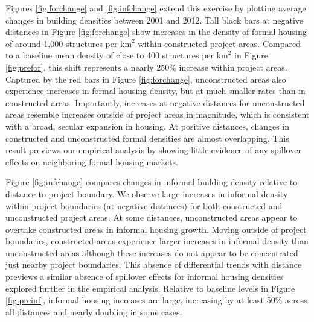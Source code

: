 \documentclass[12pt]{article}
\begin{document}
Figures \ref{fig:forchange} and \ref{fig:infchange} extend this exercise by plotting average changes in building densities between 2001 and 2012.  Tall black bars at negative distances in Figure \ref{fig:forchange} show increases in the density of formal housing of around 1,000 structures per $\text{km}^{2}$ within constructed project areas.  Compared to a baseline mean density of close to 400 structures per $\text{km}^{2}$ in Figure \ref{fig:prefor}, this shift represents a nearly 250\% increase within project areas.  Captured by the red bars in Figure \ref{fig:forchange}, unconstructed areas also experience increases in formal housing density, but at much smaller rates than in constructed areas.  Importantly, increases at negative distances for unconstructed areas resemble increases outside of project areas in magnitude, which is consistent with a broad, secular expansion in housing.  At positive distances, changes in constructed and unconstructed formal densities are almost overlapping.  This result previews our empirical analysis by showing little evidence of any spillover effects on neighboring formal housing markets.

Figure \ref{fig:infchange} compares changes in informal building density relative to distance to project boundary.  We observe large increases in informal density within project boundaries (at negative distances) for both constructed and unconstructed project areas.  At some distances, unconstructed areas appear to overtake constructed areas in informal housing growth.  Moving outside of project boundaries, constructed areas experience larger increases in informal density than unconstructed areas although these increases do not appear to be concentrated just nearby project boundaries.  This absence of differential trends with distance previews a similar absence of spillover effects for informal housing densities explored further in the empirical analysis.  Relative to baseline levels in Figure \ref{fig:preinf}, informal housing increases are large, increasing by at least 50\% across all distances and nearly doubling in some cases.

\end{document}
